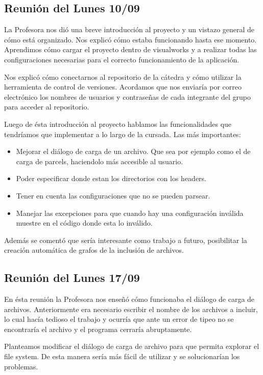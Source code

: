 \documentclass[a4paper,oneside,12pt]{article}
\begin{document}
\subsection{Reuni\'on del Lunes 10/09}
La Profesora nos di\'o una breve introducci\'on al proyecto y un vistazo general de c\'omo est\'a organizado. Nos explic\'o c\'omo estaba funcionando hasta ese momento. Aprendimos c\'omo cargar el proyecto dentro de visualworks y a realizar todas las configuraciones necesarias para el correcto funcionamiento de la aplicaci\'on.

Nos explic\'o c\'omo conectarnos al repositorio de la c\'atedra y c\'omo utilizar la herramienta de control de versiones.
Acordamos que nos enviar\'ia por correo electr\'onico los nombres de usuarios y contraseñas de cada integrante del grupo para acceder al repositorio.

Luego de \'esta introducci\'on al proyecto hablamos las funcionalidades que tendr\'iamos que implementar a lo largo de la cursada. Las m\'as importantes:

\begin{itemize}
  \item Mejorar el di\'alogo de carga de un archivo. Que sea por ejemplo como el de carga de parcels, haciendolo m\'as accesible al usuario.
  \item Poder especificar donde estan los directorios con los headers.
  \item Tener en cuenta las configuraciones que no se pueden parsear.
  \item Manejar las excepciones para que cuando hay una configuraci\'on inv\'alida muestre en el c\'odigo donde esta lo inv\'alido. 
\end{itemize}

Adem\'as se coment\'o que ser\'ia interesante como trabajo a futuro, posibilitar la creaci\'on autom\'atica de grafos de la inclusi\'on de archivos.

\subsection{Reuni\'on del Lunes 17/09}
En \'esta reuni\'on la Profesora nos enseñ\'o c\'omo funcionaba el di\'alogo de carga de archivos. Anteriormente era necesario escribir el nombre de los archivos a incluir, lo cual hac\'ia tedioso el trabajo y ocurr\'ia que ante un error de tipeo no se encontrar\'ia el archivo y el programa cerrar\'ia abruptamente. 

Planteamos modificar el di\'alogo de carga de archivo para que permita explorar el file system. De esta manera ser\'ia m\'as f\'acil de utilizar y se solucionar\'ian los problemas.
\end{document}
